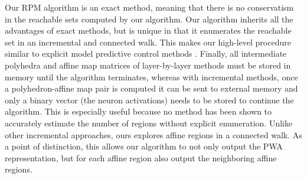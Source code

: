 Our RPM algorithm is an exact method, meaning that there is no conservatism in the reachable sets computed by our algorithm.
Our algorithm inherits all the advantages of exact methods, but is unique in that it enumerates the reachable set in an incremental and connected walk.
This makes our high-level procedure similar to explicit model predictive control methods \cite{eMPC_book}. 
Finally, all intermediate polyhedra and affine map matrices of layer-by-layer methods must be stored in memory until the algorithm terminates, whereas with incremental methods, once a polyhedron-affine map pair is computed it can be sent to external memory and only a binary vector (the neuron activations) needs to be stored to continue the algorithm. 
This is especially useful because no method has been shown to accurately estimate the number of regions without explicit enumeration.
Unlike other incremental approaches, ours explores affine regions in a connected walk. As a point of distinction, this allows our algorithm to not only output the PWA representation, but for each affine region also output the neighboring affine regions.

